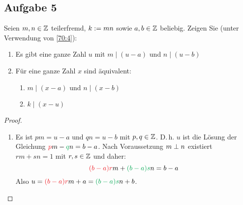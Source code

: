 \subsection{Aufgabe 5}
Seien $m,n \in \mathbb{Z}{}$ teilerfremd, $k :={} mn$ sowie
$a,b \in \mathbb{Z}{}$ beliebig. Zeigen Sie (unter Verwendung von \autoref{70:4}):
\begin{enumerate}[label=\alph*)]
  \item Es gibt eine ganze Zahl $u$ mit $m \mid (u - a)$ und $n \mid (u - b)$
  \item Für eine ganze Zahl $x$ sind äquivalent:
        \begin{enumerate}[label=\roman*)]
          \item $m \mid (x - a)$ und $n \mid (x - b)$
          \item $k \mid (x - u)$
        \end{enumerate}
\end{enumerate}
\begin{proof}
  \begin{enumerate}[label=\alph*)]
    \item Es ist $pm = u - a$ und
          $qn = u - b$ mit $p,q \in \mathbb{Z}{}$.
          D.\,h. $u$ ist die Lösung der Gleichung
          $\textcolor{Red}{p}m - \textcolor{Green}{q}n = b - a$.
          Nach Voraussetzung $m \perp n$ existiert $rm + sn = 1$
          mit $r,s \in \mathbb{Z}{}$ und daher:
          \begin{equation*}
            \textcolor{Red}{(b - a)r}m + \textcolor{Green}{(b - a)s}n = b - a
          \end{equation*}
          Also $u = \textcolor{Red}{(b - a)r}m + a = \textcolor{Green}{(b - a)s}n + b$.
  \end{enumerate}
\end{proof}

